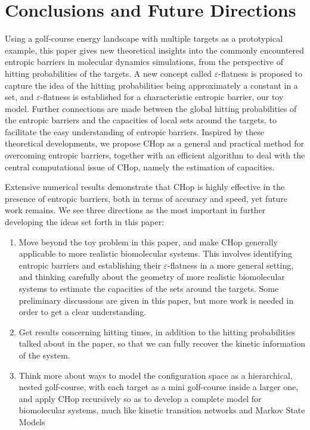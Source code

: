 \documentclass[english, aip, jcp, priprint, graphicx]{revtex4-1}
\theoremstyle{plain}
\theoremstyle{definition}
\theoremstyle{plain}
\begin{document}


\section{Conclusions and Future Directions}\label{sec:conclusion}

Using a golf-course energy landscape with multiple targets as a prototypical example, this paper gives new theoretical insights into the commonly encountered entropic barriers in molecular dynamics simulations, from the perspective of hitting probabilities of the targets. A new concept called $\varepsilon$-flatness is proposed to capture the idea of the hitting probabilities being approximately a constant in a set, and $\varepsilon$-flatness is established for a characteristic entropic barrier, our toy model. Further connections are made between the global hitting probabilities of the entropic barriers and the capacities of local sets around the targets, to facilitate the easy understanding of entropic barriers. Inspired by these theoretical developments, we propose CHop as a general and practical method for overcoming entropic barriers, together with an efficient algorithm to deal with the central computational issue of CHop, namely the estimation of capacities.

Extensive numerical results demonstrate that CHop is highly effective in the presence of entropic barriers, both in terms of accuracy and speed, yet future work remains. We see three directions as the most important in further developing the ideas set forth in this paper:
\begin{enumerate}
	\item Move beyond the toy problem in this paper, and make CHop generally applicable to more realistic biomolecular systems. This involves identifying entropic barriers and establishing their $\varepsilon$-flatness in a more general setting, and thinking carefully about the geometry of more realistic biomolecular systems to estimate the capacities of the sets around the targets. Some preliminary discussions are given in this paper, but more work is needed in order to get a clear understanding.
	\item Get results concerning hitting times, in addition to the hitting probabilities talked about in the paper, so that we can fully recover the kinetic information of the system.
	\item Think more about ways to model the configuration space as a hierarchical, nested golf-course, with each target as a mini golf-course inside a larger one, and apply CHop recursively so as to develop a complete model for biomolecular systems, much like kinetic transition networks\cite{Noe2006-cs, Wales2006-ur} and Markov State Models \cite{Pande2010-yi, Chodera2014-bh, Husic2018-xp}
\end{enumerate}
\end{document}

